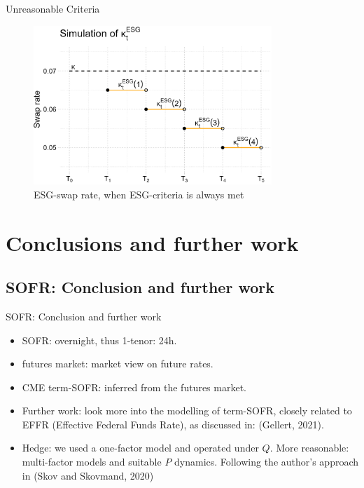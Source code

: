 \documentclass[UKenglish]{beamer}
\begin{document}
\begin{frame}{Unreasonable Criteria}
\begin{figure}[htp]
    \centering
    \includegraphics[width= 9cm]{ESG/kappa_t_ESG_2.png}
    \caption{ESG-swap rate, when ESG-criteria is always met}
    \label{fig: ESG_swap_2}
\end{figure}
\end{frame}


\section{Conclusions and further work}
\SectionPage

\subsection{SOFR: Conclusion and further work}
\begin{frame}{SOFR: Conclusion and further work}
\begin{itemize}
    \item SOFR: overnight, thus 1-tenor: 24h. 
    \item futures market: market view on future rates. 
    \item CME term-SOFR: inferred from the futures market. 
    \item Further work: look more into the modelling of term-SOFR, closely related to EFFR (Effective Federal Funds Rate), as discussed in: \cite{gellert2021short} (Gellert, 2021).  
    \item Hedge: we used a one-factor model and operated under $Q$. More reasonable: multi-factor models and suitable $ P$ dynamics. Following the author's approach in \cite{SS20} (Skov and Skovmand, 2020)
\end{itemize}
\end{frame}
\end{document}
